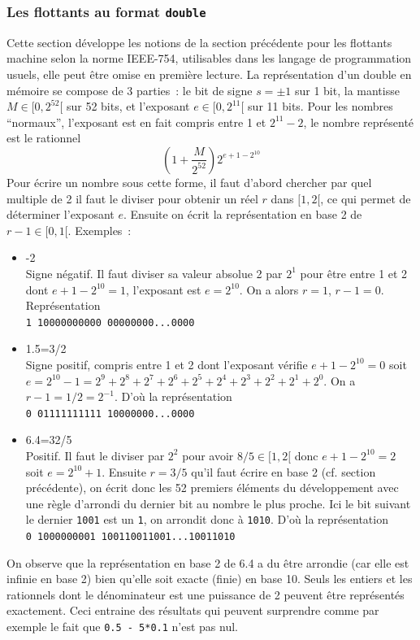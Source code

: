 \documentclass[a4paper,11pt]{article}
\begin{document}
\begin{giacjshere}
\subsubsection{Les flottants au format {\tt double}} 
 
Cette section d\'eveloppe les notions de la section pr\'ec\'edente
pour les flottants machine selon la norme IEEE-754, utilisables dans les langage de
programmation usuels, elle peut \^etre omise en première lecture.
La représentation d'un double
en mémoire se compose de 3 parties~: le bit 
de signe $s=\pm 1$ sur 1 bit, 
la mantisse $M \in [0,2^{52}[$ sur 52 bits, 
et l'exposant $e \in [0, 2^{11}[$ sur 11 bits. Pour les nombres
``normaux'', l'exposant est en fait compris entre 1 et $2^{11}-2$,
le nombre repr\'esent\'e est le rationnel
\[ (1+\frac{M}{2^{52}}) 2^{e+1-2^{10}} \]
Pour \'ecrire un nombre sous cette forme, il faut d'abord chercher par
quel multiple de 2 il faut le diviser pour obtenir un r\'eel $r$ dans
$[1,2[$, ce qui permet de d\'eterminer l'exposant $e$. Ensuite on
\'ecrit la repr\'esentation en base 2 de $r-1 \in [0,1[$.
Exemples~:
\begin{itemize}
\item -2 \\
Signe n\'egatif. Il faut diviser sa valeur absolue 
2 par $2^1$ pour \^etre entre 1 et 2 dont
$e+1-2^{10}=1$, l'exposant est $e=2^{10}$. On a alors $r=1$, $r-1=0$.
Repr\'esentation \\
\verb|1 10000000000 00000000...0000|
\item 1.5=3/2\\
Signe positif, compris entre 1 et 2 dont l'exposant v\'erifie
$e+1-2^{10}=0$ soit
$e=2^{10}-1=2^9+2^8+2^7+2^6+2^5+2^4+2^3+2^2+2^1+2^0$. 
On a $r-1=1/2=2^{-1}$. D'o\`u la repr\'esentation\\
\verb|0 01111111111 10000000...0000|
\item 6.4=32/5\\
Positif. Il faut le diviser par $2^{2}$ pour avoir $8/5 \in [1,2[$
donc $e+1-2^{10}=2$ soit $e=2^{10}+1$. Ensuite $r=3/5$ qu'il faut
\'ecrire en base 2 (cf. section pr\'ec\'edente),
on \'ecrit donc les 52 premiers \'el\'ements du d\'eveloppement
avec une r\`egle d'arrondi du dernier bit au nombre le plus proche. 
Ici le bit suivant le dernier \verb|1001| est un \verb|1|, on arrondit
donc \`a \verb|1010|. D'o\`u la repr\'esentation\\
\verb|0 1000000001 100110011001...10011010|\\
\end{itemize}
On observe que la repr\'esentation en base 2 de 6.4 a du \^etre
arrondie (car elle est infinie en base 2) bien qu'elle soit exacte
(finie) en base 10.
Seuls les entiers et les rationnels dont le d\'enominateur est une puissance
de 2 peuvent \^etre repr\'esent\'es exactement.
Ceci entraine des r\'esultats qui peuvent surprendre
comme par exemple le fait que
\verb|0.5 - 5*0.1| n'est pas nul.


\end{giacjshere}
\end{document}
